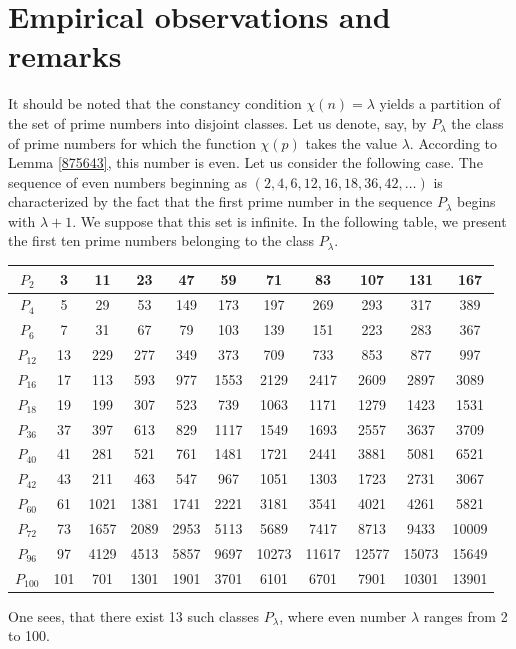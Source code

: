 \documentclass[reqno,a4paper,11pt]{amsart}
\numberwithin{equation}{section}
\theoremstyle{definition}
\begin{document}
\section{Empirical observations and remarks}

It should be noted that the constancy condition $\chi(n)=\lambda$ yields a partition of the set of prime numbers into disjoint classes. 
Let us denote, say, by $P_{\lambda}$ the class of prime numbers for which the function $\chi(p)$ takes  the value $\lambda$. According to Lemma \ref{875643}, this number is even.
Let us consider the following case.  The sequence of even numbers beginning as $(2, 4, 6, 12, 16, 18, 36, 42,\ldots)$ is characterized by the fact that the first prime number in the sequence $P_{\lambda}$ begins with $\lambda+1$.  We suppose that this set is infinite.
In the following table, we present the first ten prime numbers belonging to the class $P_{\lambda}$.
\begin{center}
\begin{tabular}{|c|c|c|c|c|c|c|c|c|c|c|}
\hline
$P_2$ &3 & 11 & 23 & 47 & 59 & 71 & 83 & 107 & 131 & 167 \\
\hline
$P_4$ & 5 & 29 & 53 & 149 & 173 & 197   & 269 & 293 & 317  & 389 \\
\hline
$P_6$ & 7 & 31 & 67 & 79 & 103  & 139  & 151 & 223  & 283 & 367 \\
\hline
$P_{12}$ & 13 & 229  & 277 & 349  & 373 & 709 & 733 & 853 & 877 & 997 \\
\hline
$P_{16}$ & 17 & 113 & 593 & 977 & 1553 & 2129 & 2417 & 2609 & 2897 & 3089  \\
\hline
$P_{18}$   & 19 & 199  & 307 & 523 & 739 & 1063 & 1171 & 1279 & 1423 & 1531 \\
\hline
$P_{36}$ &  37   & 397 & 613 & 829 & 1117 & 1549 & 1693 & 2557 & 3637 & 3709 \\
\hline
$P_{40}$  &  41 & 281 & 521 & 761 & 1481  &  1721 & 2441  & 3881 & 5081 & 6521 \\
\hline
$P_{42}$  &  43 & 211 & 463  & 547 & 967  &  1051   & 1303  & 1723 & 2731 & 3067\\
\hline
 $P_{60}$ & 61  & 1021 &  1381 & 1741 &  2221 &  3181 &  3541 & 4021 & 4261  & 5821\\
\hline
$P_{72}$ & 73 &  1657 & 2089  & 2953 &  5113 &  5689 & 7417  & 8713 & 9433  & 10009 \\
\hline
$P_{96}$ & 97 & 4129  & 4513  & 5857 &  9697 & 10273  & 11617  & 12577 & 15073  & 15649 \\
\hline
$P_{100}$ & 101 & 701  & 1301  & 1901 & 3701  & 6101  & 6701 & 7901 & 10301  & 13901 \\
\hline
\end{tabular}
\end{center}
One sees, that there exist 13 such classes $P_{\lambda}$, where even number  $\lambda$ ranges from 2 to 100.
\end{document}
